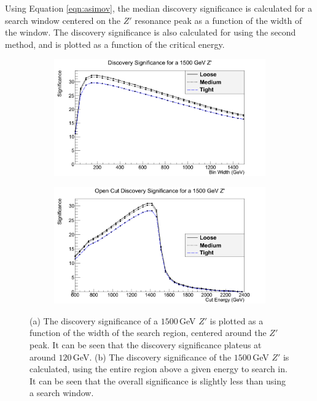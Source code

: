 \documentclass{article}
\begin{document}
Using Equation \ref{eqn:asimov}, the median discovery significance is calculated for a search window centered on the $Z'$ resonance peak as a function of the width of the window. The discovery significance is also calculated for using the second method, and is plotted as a function of the critical energy.

\begin{figure}[htb]
    \centering
    \begin{subfigure}{.49\textwidth}
        \includegraphics[height=0.6\textwidth]{images/DS1500.png}
        \caption{}
        \label{fig:DS1500}
    \end{subfigure}	
    \begin{subfigure}{.49\textwidth}
        \includegraphics[height=0.6\textwidth]{images/IDS1500.png}
        \caption{}
        \label{fig:IDS1500}
    \end{subfigure}
    \caption{ (a) The discovery significance of a $1500\,$GeV $Z'$ is plotted as a function of the width of the search region, centered around the $Z'$ peak. It can be seen that the discovery significance plateus at around $120\,$GeV. (b) The discovery significance of the $1500\,$GeV $Z'$ is calculated, using the entire region above a given energy to search in. It can be seen that the overall significance is slightly less than using a search window. \label{fig:DiscoverySignificance}}
\end{figure}
\end{document}
